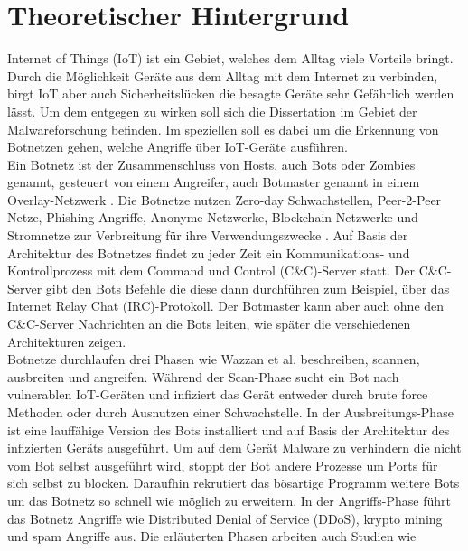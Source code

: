 \section{Theoretischer Hintergrund}
\label{sec:theory}

Internet of Things (IoT) ist ein Gebiet, welches dem Alltag viele Vorteile bringt. Durch die Möglichkeit
Geräte aus dem Alltag mit dem Internet zu verbinden, birgt IoT aber auch Sicherheitslücken die besagte Geräte sehr Gefährlich
werden lässt. Um dem entgegen zu wirken soll sich die Dissertation im Gebiet der Malwareforschung befinden. Im speziellen soll es dabei um 
die Erkennung von Botnetzen gehen, welche Angriffe über IoT-Geräte ausführen. \\ Ein Botnetz ist der Zusammenschluss von Hosts, auch Bots oder Zombies genannt, gesteuert von einem Angreifer, 
auch Botmaster genannt in einem Overlay-Netzwerk \cite{Xing2021SurveyOB}. Die Botnetze nutzen Zero-day Schwachstellen, Peer-2-Peer Netze, Phishing Angriffe, Anonyme Netzwerke,
Blockchain Netzwerke und Stromnetze zur Verbreitung für ihre Verwendungszwecke \cite{DBLP:conf/cycon/CasenoveM14,DBLP:conf/esorics/KurtECAU20}. Auf Basis der Architektur 
des Botnetzes findet zu jeder Zeit ein Kommunikations- und Kontrollprozess mit dem Command und Control (C\&C)-Server statt. Der C\&C-Server gibt den Bots Befehle die 
diese dann durchführen \cite{SCHILLER200729} zum Beispiel, über das Internet Relay Chat (IRC)-Protokoll. Der Botmaster kann aber auch ohne den C\&C-Server Nachrichten an die Bots leiten, wie
später die verschiedenen Architekturen zeigen. \\ Botnetze durchlaufen drei Phasen wie Wazzan et al. 
\cite{Wazzan2021InternetOT} beschreiben, scannen, ausbreiten und angreifen. Während der Scan-Phase sucht ein Bot nach vulnerablen IoT-Geräten und 
infiziert das Gerät entweder durch brute force Methoden oder durch Ausnutzen einer Schwachstelle.
In der Ausbreitungs-Phase ist eine lauffähige Version des Bots installiert und auf Basis der Architektur des infizierten Geräts ausgeführt.
Um auf dem Gerät Malware zu verhindern die nicht vom Bot selbst ausgeführt wird, stoppt der Bot andere Prozesse um Ports für sich selbst zu blocken. 
Daraufhin rekrutiert das bösartige Programm weitere Bots um das Botnetz so schnell wie möglich zu erweitern. In der Angriffs-Phase führt das Botnetz Angriffe wie Distributed Denial of 
Service (DDoS), krypto mining und spam Angriffe aus. Die erläuterten Phasen arbeiten auch Studien wie \cite{10.1007/978-3-030-33229-7_21, Alzahrani2020,DBLP:journals/computer/VlajicZ18,NGUYEN2020128} 
